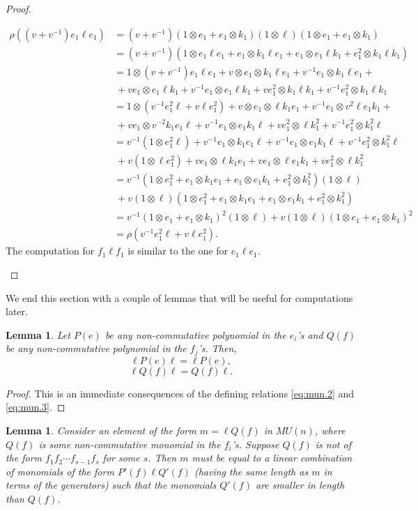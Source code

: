 \documentclass{amsart}
\numberwithin{equation}{section}
\theoremstyle{theorem}
\newtheorem{lemma}[theorem]{Lemma}
\theoremstyle{definition}
\begin{document}
\begin{proof}
\begin{enumerate}
\begin{align*}
\rho((v+v^{-1})e_1\ell e_1)&= (v+v^{-1})(1\otimes e_1+e_1\otimes k_1)(1\otimes \ell)(1\otimes e_1+e_1\otimes k_1) \\
&= (v+v^{-1})(1\otimes e_1\ell e_1+e_1\otimes k_1\ell e_1+e_1\otimes e_1\ell k_1+e_1^2\otimes k_1\ell k_1)\\
&= 1\otimes (v+v^{-1}) e_1\ell e_1+v\otimes e_1\otimes k_1\ell e_1+v^{-1}e_1\otimes k_1\ell e_1+ \\
&~+ ve_1\otimes e_1\ell k_1+v^{-1}e_1\otimes e_1\ell k_1+ve_1^2\otimes k_1\ell k_1+v^{-1}e_1^2\otimes k_1\ell k_1\\
&= 1\otimes (v^{-1}e_1^2\ell+v\ell e_1^2)+v\otimes e_1\otimes \ell k_1e_1+v^{-1}e_1\otimes v^2 \ell e_1k_1+ \\
&~+ ve_1\otimes v^{-2}k_1e_1\ell+v^{-1}e_1\otimes e_1k_1\ell+ve_1^2\otimes \ell k_1^2+v^{-1}e_1^2\otimes k_1^2\ell \\
&= v^{-1}(1\otimes e_1^2\ell)+v^{-1}e_1\otimes k_1e_1\ell+v^{-1}e_1\otimes e_1k_1\ell+v^{-1}e_1^2\otimes k_1^2\ell\\
&~+ v(1\otimes \ell e_1^2)+v e_1\otimes \ell k_1e_1+v e_1\otimes \ell e_1k_1+ve_1^2\otimes \ell k_1^2 \\
&= v^{-1}(1\otimes e_1^2+e_1\otimes k_1e_1+e_1\otimes e_1k_1+e_1^2\otimes k_1^2)(1\otimes \ell) \\
&~+v(1\otimes \ell)(1\otimes e_1^2+ e_1\otimes k_1e_1+ e_1\otimes e_1k_1+e_1^2\otimes k_1^2) \\
&= v^{-1}(1\otimes e_1+e_1\otimes k_1)^2(1\otimes \ell)+v(1\otimes \ell)(1\otimes e_1+e_1\otimes k_1)^2\\
&= \rho(v^{-1}e_1^2\ell+v\ell e_1^2).
\end{align*}
The computation for $f_1\ell f_1$ is similar to the one for $e_1\ell e_1$.
\end{enumerate}    
\end{proof}
We end this section with a couple of lemmas that will be useful for computations later.


\begin{lemma} \label{lem:reduce}
Let $P(e)$ be any non-commutative polynomial in the $e_i$'s and $Q(f)$ be any non-commutative polynomial in the $f_j$'s. Then,
\[\ell P(e) \ell = \ell P(e),\]
\[\ell Q(f) \ell = Q(f)\ell.\]
\end{lemma}

\begin{proof}
This is an immediate consequences of the defining relations \eqref{eq:mun.2} and \eqref{eq:mun.3}.
\end{proof}
\begin{lemma} \label{lem:std}
Consider an element of the form $m=\ell Q(f)$ in $MU(n)$, where $Q(f)$ is some non-commutative monomial in the $f_i$'s. Suppose $Q(f)$ is not of the form $f_1f_{2}\cdots f_{s-1} f_s$ for some $s$. Then $m$ must be equal to a linear combination of monomials of the form $P'(f) \ell Q'(f)$ (having the same length as $m$ in terms of the generators) such that the monomials $Q'(f)$ are smaller in length than $Q(f)$.
\end{lemma}
\end{document}

